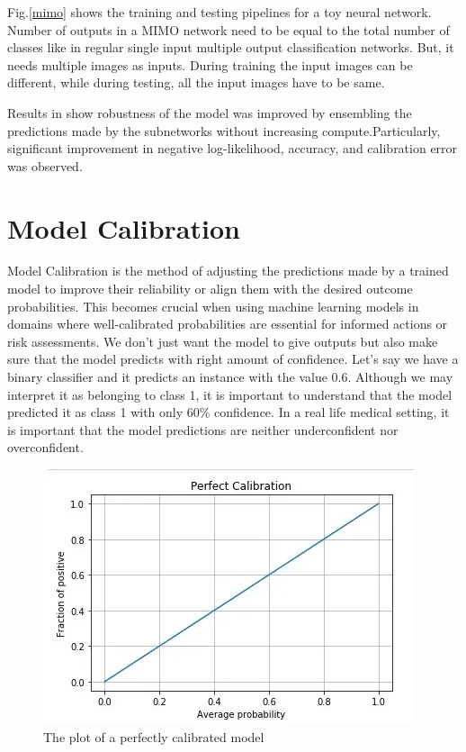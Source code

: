 Fig.\ref{mimo} shows the training and testing pipelines for a toy neural network. Number of outputs in a MIMO network need to be equal to the total number of classes like in regular single input multiple output classification networks. But, it needs multiple images as inputs. During training the input images can be different, while during testing, all the input images have to be same.

Results in \cite{havasi2021training} show robustness of the model was improved by ensembling the predictions made by the subnetworks without increasing compute.Particularly, significant improvement in negative log-likelihood, accuracy, and calibration error was observed.

\section{Model Calibration}

Model Calibration is the method of adjusting the predictions made by a trained model to improve their reliability or align them with the desired outcome probabilities. This becomes crucial when using machine learning models in domains where well-calibrated probabilities are essential for informed actions or risk assessments. We don't just want the model to give outputs but also make sure that the model predicts with right amount of confidence. Let's say we have a binary classifier and it predicts an instance with the value 0.6. Although we may interpret it as belonging to class 1, it is important to understand that the model predicted it as class 1 with only 60\% confidence. In a real life medical setting, it is important that the model predictions are neither underconfident nor overconfident. 

\begin{figure}[!htbp]
  \begin{center}
    \leavevmode
    \ifpdf
      \includegraphics[scale=0.7]
      {Chapter2/Chapter2Figs/per_cal.png}    
    \fi
    \caption{The plot of a perfectly calibrated model}
    \label{per_cal}
  \end{center}
\end{figure}


